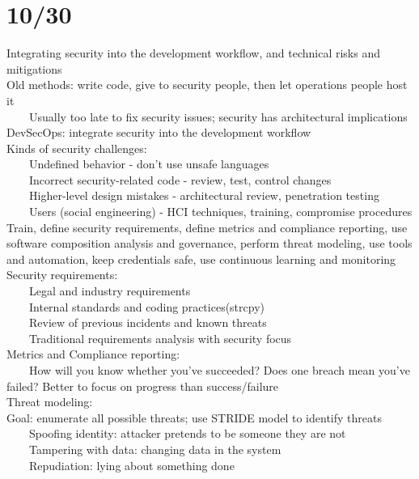 \documentclass[10pt,letterpaper,unboxed,cm]{article}
\newcommand{\tab}{~~~~}
\begin{document}
\section{10/30}
Integrating security into the development workflow, and technical risks and mitigations\\
Old methods: write code, give to security people, then let operations people host it\\
\tab Usually too late to fix security issues; security has architectural implications\\
DevSecOps: integrate security into the development workflow\\
Kinds of security challenges: \\
\tab Undefined behavior - don't use unsafe languages\\
\tab Incorrect security-related code - review, test, control changes\\
\tab Higher-level design mistakes - architectural review, penetration testing\\
\tab Users (social engineering) - HCI techniques, training, compromise procedures\\
Train, define security requirements, define metrics and compliance reporting, use software composition analysis and governance, 
perform threat modeling, use tools and automation, keep credentials safe, use continuous learning and monitoring\\
Security requirements: \\
\tab Legal and industry requirements\\
\tab Internal standards and coding practices(strcpy)\\
\tab Review of previous incidents and known threats\\
\tab Traditional requirements analysis with security focus\\
Metrics and Compliance reporting: \\
\tab How will you know whether you've succeeded? Does one breach mean you've failed? Better to focus on progress than success/failure\\
Threat modeling: \\
Goal: enumerate all possible threats; use STRIDE model to identify threats\\
\tab Spoofing identity: attacker pretends to be someone they are not\\
\tab Tampering with data: changing data in the system\\
\tab Repudiation: lying about something done\\
\end{document}
